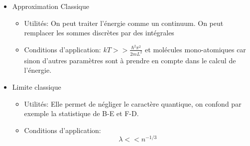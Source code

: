\begin{itemize}[label=]

	\item Approximation Classique

	\begin{itemize}[label=]

		 \item Utilités:
		 On peut traiter l'énergie comme un continuum. On peut remplacer les sommes discrètes par des intégrales
		 \item Conditions d'application:
		 $kT>> \frac{\hbar^2 \pi^2}{2mL^2}$ et molécules mono-atomiques car sinon d'autres paramètres sont à prendre en compte dans le calcul de l'énergie.

	\end{itemize}


	\item Limite classique

	\begin{itemize}[label=]

		 \item Utilités:
		 Elle permet de négliger le caractère quantique, on confond par exemple la statistique de B-E et F-D.
		 \item Conditions d'application:
		$$\lambda<<n^{-1/3}$$

	 \end{itemize}

\end{itemize}